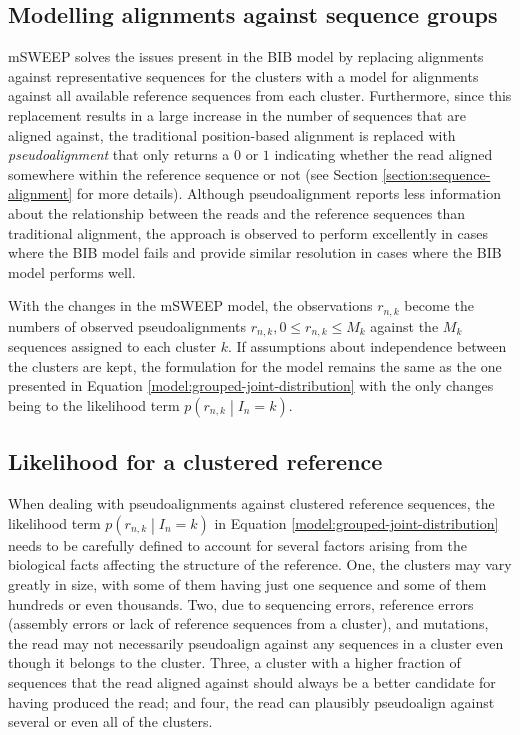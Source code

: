 \documentclass[officiallayout]{tktla}
\begin{document}
\subsection{Modelling alignments against sequence groups}

mSWEEP solves the issues present in the BIB model by replacing
alignments against representative sequences for the clusters with a
model for alignments against all available reference sequences from
each cluster. Furthermore, since this replacement results in a large
increase in the number of sequences that are aligned against, the
traditional position-based alignment is replaced with
\textit{pseudoalignment} that only returns a $0$ or $1$ indicating
whether the read aligned somewhere within the reference sequence or
not (see Section \ref{section:sequence-alignment} for more
details). Although pseudoalignment reports less information about the
relationship between the reads and the reference sequences than
traditional alignment, the approach is observed to perform excellently
in cases where the BIB model fails and provide similar resolution in
cases where the BIB model performs well.

With the changes in the mSWEEP model, the observations $r_{n, k}$
become the numbers of observed pseudoalignments $r_{n, k}, 0 \leq
r_{n, k} \leq M_{k}$ against the $M_{k}$ sequences assigned to each
cluster $k$. If assumptions about independence between the clusters
are kept, the formulation for the model remains the same as the one
presented in Equation \ref{model:grouped-joint-distribution} with the
only changes being to the likelihood term $p\left(r_{n, k} \middle|
I_{n} = k\right)$.


\subsection{Likelihood for a clustered reference}

When dealing with pseudoalignments against clustered reference
sequences, the likelihood term $p\left(r_{n, k} \middle| I_{n} =
k\right)$ in Equation \ref{model:grouped-joint-distribution} needs to
be carefully defined to account for several factors arising from the
biological facts affecting the structure of the reference. One, the
clusters may vary greatly in size, with some of them having just one
sequence and some of them hundreds or even thousands. Two, due to
sequencing errors, reference errors (assembly errors or lack of
reference sequences from a cluster), and mutations, the read may not
necessarily pseudoalign against any sequences in a cluster even though
it belongs to the cluster. Three, a cluster with a higher fraction of
sequences that the read aligned against should always be a better
candidate for having produced the read; and four, the read can
plausibly pseudoalign against several or even all of the clusters.
\end{document}
